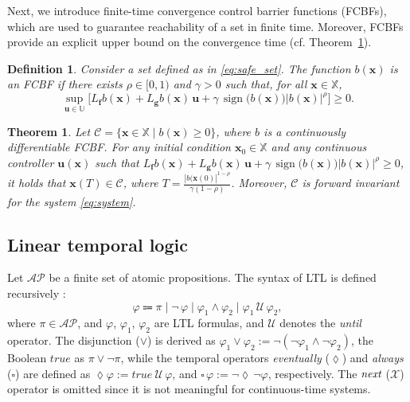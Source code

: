 \documentclass[letterpaper, 10 pt, conference]{ieeeconf}  %
\newtheorem{definition}{Definition}
\newtheorem{theorem}{Theorem}
\begin{document}
Next, we introduce finite-time convergence control barrier functions (FCBFs), which are used to guarantee reachability of a set in finite time. Moreover, FCBFs provide an explicit upper bound on the convergence time (cf. Theorem~\ref{thm:reachability}).
\begin{definition} \label{def:fcbf}
    Consider a set defined as in \eqref{eq:safe_set}. The function $b(\mathbf{x})$ is an FCBF if there exists $\rho \in [0,1)$ and $\gamma > 0$ such that, for all $\mathbf{x} \in \mathbb{X}$,
    \begin{equation} \label{eq:fcbf}
       \sup_{\mathbf{u} \in \mathbb{U}} \Big[ L_\mathbf{f} b ( \mathbf{x}) + L_\mathbf{g} b ( \mathbf{x}) \, \mathbf{u} + \gamma \, \operatorname{sign} \big( b(\mathbf{x}) \big) \big| b(\mathbf{x}) \big|^\rho \Big] \ge 0.
    \end{equation}
\end{definition}

\begin{theorem} \label{thm:reachability}
    \cite{li2018} Let $\mathcal{C} = \{\mathbf{x} \in \mathbb{X} \mid b(\mathbf{x}) \ge 0 \}$, where $b$ is a continuously differentiable FCBF. For any initial condition $\mathbf{x}_0 \in \mathbb{X}$ and any continuous controller $\mathbf{u}(\mathbf{x})$ such that $L_\mathbf{f} b ( \mathbf{x}) + L_\mathbf{g} b ( \mathbf{x}) \, \mathbf{u} + \gamma \, \operatorname{sign} \big( b(\mathbf{x}) \big) \big| b(\mathbf{x}) \big|^\rho \ge 0$, it holds that $\mathbf{x}(T) \in \mathcal{C}$, where $T = \tfrac{|b(\mathbf{x}(0)|^{1 - \rho}}{\gamma (1 - \rho)}$. Moreover, $\mathcal{C}$ is forward invariant for the system \eqref{eq:system}.
\end{theorem}

\subsection{Linear temporal logic}

Let $\mathcal{AP}$ be a finite set of atomic propositions. The syntax of LTL is defined recursively \cite{baier2008}:
\begin{equation*} \label{eq:ltl}
    \varphi \Coloneqq \pi \mid \lnot \, \varphi \mid \varphi_1 \land \varphi_2 \mid \varphi_1 \, \mathcal{U} \, \varphi_2,
\end{equation*}
where $\pi \in \mathcal{AP}$, and $\varphi$, $\varphi_1$, $\varphi_2$ are LTL formulas, and $\mathcal{U}$ denotes the \emph{until} operator. The disjunction ($\lor$) is derived as $\varphi_1 \lor \varphi_2 := \lnot (\lnot \varphi_1 \land \lnot \varphi_2)$, the Boolean $true$ as $\pi \lor \lnot \pi$, while the temporal operators \emph{eventually} ($\lozenge$) and \emph{always} ($\square$) are defined as $\lozenge \varphi  := true \ \mathcal{U} \, \varphi$, and $\square \, \varphi {:=} \lnot  \lozenge \, \lnot \varphi$, respectively. The $\emph{next}$ ($\mathcal{X}$) operator is omitted since it is not meaningful for continuous-time systems.
\end{document}
